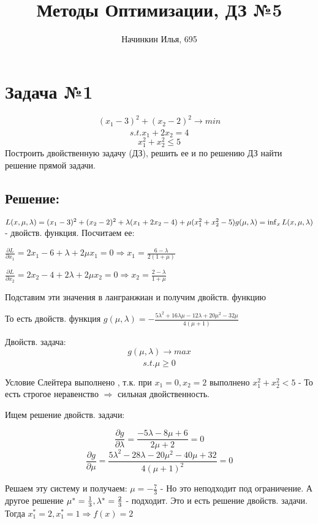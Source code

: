 \documentclass[a4paper]{article}
\title{Методы Оптимизации, ДЗ №5}
\author{Начинкин Илья, 695}
\begin{document}
\maketitle

\section*{Задача №1}
$$(x_1 - 3)^2 + (x_2 - 2)^2 \xrightarrow[]{} min$$
$$s.t. x_1 + 2x_2 = 4$$
    $$x_1^2 + x_2^2 \leq 5$$
Построить двойственную задачу (ДЗ), решить ее и по решению ДЗ найти решение прямой задачи.   
\subsection*{Решение:}

$L(x, \mu, \lambda) = (x_1 - 3)^2 + (x_2 - 2)^2 + \lambda(x_1 + 2x_2 - 4) + \mu(x_1^2 + x_2^2 - 5) \\
g(\mu,\lambda) = \inf_{x}L(x, \mu, \lambda)$ - двойств. функция. 
Посчитаем ее:

$\frac{\partial L}{\partial x_1} = 2x_1 - 6 + \lambda + 2\mu x_1 = 0 \Longrightarrow x_1 = \frac{6 - \lambda}{2(1+\mu)}$

$\frac{\partial L}{\partial x_2} = 2x_2 - 4 + 2\lambda + 2\mu x_2 = 0 \Longrightarrow x_2 = \frac{2 - \lambda}{1+\mu}$

Подставим эти значения в  лангранжиан и получим двойств. функцию

То есть двойств. функция $g(\mu, \lambda) = -\frac{5\lambda^2 + 16\lambda\mu - 12\lambda + 20\mu^2 - 32\mu}{4(\mu + 1)}$

Двойств. задача:
$$g(\mu, \lambda) \xrightarrow[]{} max$$
$$s.t. \mu \geq 0$$

Условие Слейтера выполнено , т.к. при $x_1 = 0, x_2 = 2$ выполнено $ x_1^2 + x_2^2 < 5$ - То есть строгое неравенство $\Longrightarrow$ сильная двойственность.

Ищем решение двойств. задачи:

$$\frac{\partial g}{\partial \lambda} = \frac{-5\lambda - 8\mu + 6}{2\mu + 2} = 0$$
$$\frac{\partial g}{\partial \mu} = \frac{5\lambda^2 - 28\lambda - 20\mu^2 - 40\mu + 32}{4(\mu + 1)^2} = 0$$

Решаем эту систему и получаем:
$\mu = -\frac{7}{3}$ - Но это неподходит под ограничение. А другое решение $ \\
\mu^* = \frac{1}{3}, \lambda^* = \frac{2}{3}$ - подходит. Это и есть решение двойств. задачи.
Тогда $x_1^* = 2, x_1^* = 1 \Longrightarrow f(x) = 2$ 
\end{document}
